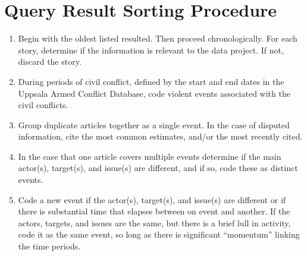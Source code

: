 \documentclass[letterpaper,10pt,english]{sphinxmanual}
\begin{document}
\section{Query Result Sorting Procedure}
\label{\detokenize{event_query_procedure:query-result-sorting-procedure}}\begin{enumerate}
%
\item {} 
\sphinxAtStartPar
Begin with the oldest listed resulted.  Then proceed chronologically.  For each story, determine if the information is relevant to the data project.  If not, discard the story.

\item {} 
\sphinxAtStartPar
During periods of civil conflict, defined by the start and end dates in the Uppsala Armed Conflict Database, code violent events associated with the civil conflicts.

\item {} 
\sphinxAtStartPar
Group duplicate articles together as a single event.  In the case of disputed information, cite the most common estimates, and/or the most recently cited.

\item {} 
\sphinxAtStartPar
In the case that one article covers multiple events determine if the main actor(s), target(s), and issue(s) are different, and if so, code these as distinct events.

\item {} 
\sphinxAtStartPar
Code a new event if the actor(s), target(s), and issue(s) are different or if there is substantial time that elapses between on event and another.  If the actors, targets, and issues are the same, but there is a brief lull in activity, code it as the same event, so long as there is significant “momentum” linking the time periods.

\end{enumerate}
\end{document}

